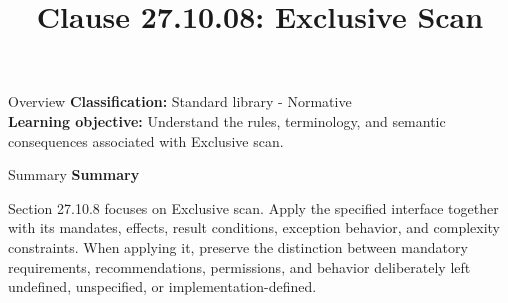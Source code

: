 \documentclass[10pt,letterpaper]{article}
\title{Clause 27.10.08: Exclusive Scan}
\author{}
\date{}
\begin{document}
\maketitle
\begin{CornellOverviewBox}{Overview}
\textbf{Classification:} Standard library - Normative\\[2pt]
\textbf{Learning objective:} Understand the rules, terminology, and semantic consequences associated with Exclusive scan.
\end{CornellOverviewBox}\begin{CornellSummaryBox}{Summary}
{\sffamily\bfseries\color{Accent} Summary}\par\vspace{3pt}Section 27.10.8 focuses on Exclusive scan. Apply the specified interface together with its mandates, effects, result conditions, exception behavior, and complexity constraints. When applying it, preserve the distinction between mandatory requirements, recommendations, permissions, and behavior deliberately left undefined, unspecified, or implementation-defined.
\end{CornellSummaryBox}
\end{document}
